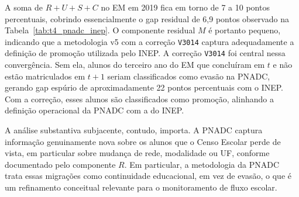 A soma de $R + U + S + C$ no EM em 2019 fica em torno de 7 a 10
pontos percentuais, cobrindo essencialmente o gap residual de
6,9 pontos observado na Tabela~\ref{tab:t4_pnadc_inep}. O
componente residual $M$ é portanto pequeno, indicando que a
metodologia v5 com a correção \texttt{V3014} captura
adequadamente a definição de promoção utilizada pelo INEP. A
correção \texttt{V3014} foi central nessa convergência. Sem
ela, alunos do terceiro ano do EM que concluíram em $t$ e não
estão matriculados em $t+1$ seriam classificados como evasão na
PNADC, gerando gap espúrio de aproximadamente 22 pontos
percentuais com o INEP. Com a correção, esses alunos são
classificados como promoção, alinhando a definição operacional
da PNADC com a do INEP.

A análise substantiva subjacente, contudo, importa. A PNADC
captura informação genuinamente nova sobre os alunos que o
Censo Escolar perde de vista, em particular sobre mudança de
rede, modalidade ou UF, conforme documentado pelo componente
$R$. Em particular, a metodologia da PNADC trata essas
migrações como continuidade educacional, em vez de evasão, o
que é um refinamento conceitual relevante para o monitoramento
de fluxo escolar.
